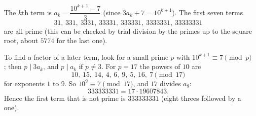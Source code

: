 The $k$th term is $a_k=\dfrac{10^{k+1}-7}{3}$ (since $3a_k+7=10^{k+1}$). The first seven terms
\[
31,\ 331,\ 3331,\ 33331,\ 333331,\ 3333331,\ 33333331
\]
are all prime (this can be checked by trial division by the primes up to the square root, about $5774$ for the last one).

To find a factor of a later term, look for a small prime $p$ with $10^{k+1}\equiv7\pmod p$; then $p\mid3a_k$, and $p\mid a_k$ if $p\neq3$. For $p=17$ the powers of $10$ are
\[
10,\ 15,\ 14,\ 4,\ 6,\ 9,\ 5,\ 16,\ 7\pmod{17}
\]
for exponents $1$ to $9$. So $10^9\equiv7\pmod{17}$, and $17$ divides $a_8$:
\[
333333331=17\cdot19607843 .
\]
Hence the first term that is not prime is $\boxed{333333331}$ (eight threes followed by a one).

